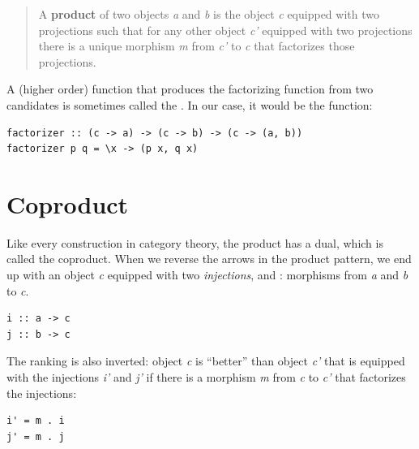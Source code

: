 \begin{quote}
A \textbf{product} of two objects \emph{a} and \emph{b} is the object
\emph{c} equipped with two projections such that for any other object
\emph{c'} equipped with two projections there is a unique morphism
\emph{m} from \emph{c'} to \emph{c} that factorizes those projections.
\end{quote}

\noindent
A (higher order) function that produces the factorizing function
 from two candidates is sometimes called the
. In our case, it would be the function:

\begin{Verbatim}
factorizer :: (c -> a) -> (c -> b) -> (c -> (a, b))
factorizer p q = \x -> (p x, q x)
\end{Verbatim}

\section{Coproduct}\label{coproduct}

Like every construction in category theory, the product has a dual,
which is called the coproduct. When we reverse the arrows in the product
pattern, we end up with an object \emph{c} equipped with two
\emph{injections},  and : morphisms from \emph{a}
and \emph{b} to \emph{c}.

\begin{Verbatim}[commandchars=\\\{\}]
i :: a -> c
j :: b -> c
\end{Verbatim}

\begin{figure}[H]
\centering
{}
\end{figure}

\noindent
The ranking is also inverted: object \emph{c} is ``better'' than object
\emph{c'} that is equipped with the injections \emph{i'} and \emph{j'}
if there is a morphism \emph{m} from \emph{c} to \emph{c'} that
factorizes the injections:

\begin{Verbatim}[commandchars=\\\{\}]
i' = m . i
j' = m . j
\end{Verbatim}

